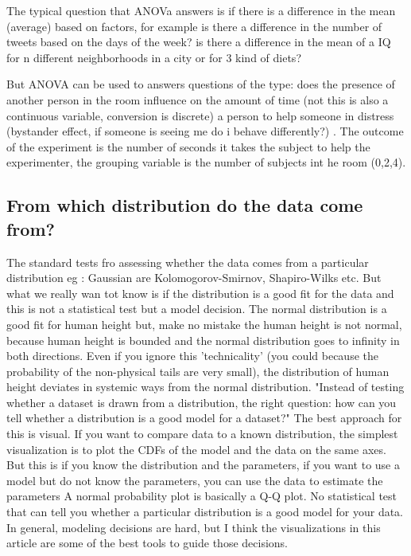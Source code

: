 \documentclass[11pt]{article}
\theoremstyle{definition}
\theoremstyle{remark}
\begin{document}
The typical question that ANOVa answers is if there is a difference in the mean (average) based on factors, for example is there a difference in the number of tweets based on the days of the week? is there a difference in the mean of a IQ for n different neighborhoods in a city or for 3 kind of diets?

But ANOVA can be used to answers questions of the type: does the presence of another person in the room influence on the amount of time (not this is also a continuous variable, conversion is discrete) a person to help someone in distress (bystander effect, if someone is seeing me do i behave differently?) \cite{darley1968bystander}. The outcome of the experiment is the number of seconds it takes the subject to help the experimenter, the grouping variable is the number of subjects int he room (0,2,4).


\subsection{From which distribution do the data come from?}
\label{sse:leaversremainers}
The standard tests fro assessing whether the data comes from a particular distribution eg : Gaussian are Kolomogorov-Smirnov, Shapiro-Wilks etc. But what we really wan tot know is if the distribution is a good fit for the data and this is not a statistical test but a model decision.
The normal distribution is a good fit for human height but, make no mistake the human height is not normal, because human height is bounded and the normal distribution goes to infinity in both directions.
Even if you ignore this 'technicality' (you could because the probability of the non-physical tails are very small), the distribution of human height deviates in systemic ways from the normal distribution.
"Instead of testing whether a dataset is drawn from a distribution, the right question: how can you tell whether a distribution is a good model for a dataset?" The best approach for this is visual.
If you want to compare data to a known distribution, the simplest visualization is to plot the CDFs of the model and the data on the same axes. But this is if you know the distribution and the parameters, if you want to use a model but do not know the parameters, you can use the data to estimate the parameters
A normal probability plot is basically a Q-Q plot. No statistical test that can tell you whether a particular distribution is a good model for your data.  In general, modeling decisions are hard, but I think the visualizations in this article are some of the best tools to guide those decisions.
\end{document}
